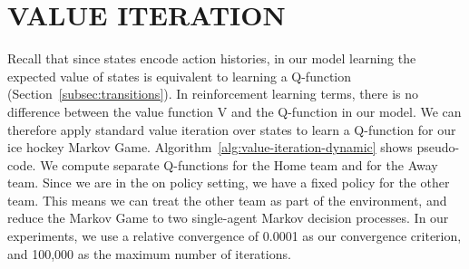 \documentclass[]{article}
\begin{document}
\section{VALUE ITERATION}
\label{subsec:value-iteration-alg}

Recall that since states encode action histories, in our model learning the expected value of states is equivalent to learning a Q-function (Section~\ref{subsec:transitions}). In reinforcement learning terms, there is no difference between the value function V and the Q-function in our model. We can therefore apply standard value iteration over states \citep{bib:sutton} to learn a Q-function
 for our ice hockey Markov Game. Algorithm~\ref{alg:value-iteration-dynamic} shows pseudo-code. We compute separate Q-functions for the Home team and for the Away team. Since we are in the on policy setting, we have a fixed policy for the other team. This means we can treat the other team as part of the environment, and reduce the Markov Game to two single-agent Markov decision processes. %
 In our experiments, we use a relative convergence of 0.0001 as our convergence criterion, and 100,000 as the maximum number of iterations.%
%
%
%
%
%
\end{document}
